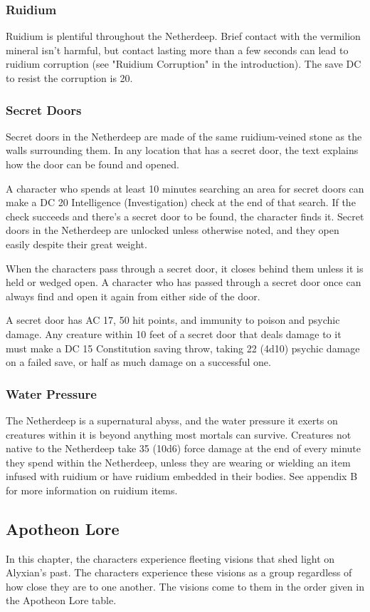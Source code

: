 \documentclass[10pt,a4paper,twoside,bg=print,twocolumn,openany,nodeprecatedcode]{dndbook}
\begin{document}
\subsubsection{Ruidium}
Ruidium is plentiful throughout the Netherdeep. Brief contact with the vermilion mineral isn't harmful, but contact lasting more than a few seconds can lead to ruidium corruption (see "Ruidium Corruption" in the introduction). The save DC to resist the corruption is 20.

\subsubsection{Secret Doors}
Secret doors in the Netherdeep are made of the same ruidium-veined stone as the walls surrounding them. In any location that has a secret door, the text explains how the door can be found and opened.

A character who spends at least 10 minutes searching an area for secret doors can make a DC 20 Intelligence (Investigation) check at the end of that search. If the check succeeds and there's a secret door to be found, the character finds it. Secret doors in the Netherdeep are unlocked unless otherwise noted, and they open easily despite their great weight.

When the characters pass through a secret door, it closes behind them unless it is held or wedged open. A character who has passed through a secret door once can always find and open it again from either side of the door.

A secret door has AC 17, 50 hit points, and immunity to poison and psychic damage. Any creature within 10 feet of a secret door that deals damage to it must make a DC 15 Constitution saving throw, taking 22 (4d10) psychic damage on a failed save, or half as much damage on a successful one.

\subsubsection{Water Pressure}
The Netherdeep is a supernatural abyss, and the water pressure it exerts on creatures within it is beyond anything most mortals can survive. Creatures not native to the Netherdeep take 35 (10d6) force damage at the end of every minute they spend within the Netherdeep, unless they are wearing or wielding an item infused with ruidium or have ruidium embedded in their bodies. See appendix B for more information on ruidium items.

\subsection{Apotheon Lore}
In this chapter, the characters experience fleeting visions that shed light on Alyxian's past. The characters experience these visions as a group regardless of how close they are to one another. The visions come to them in the order given in the Apotheon Lore table.
\end{document}
